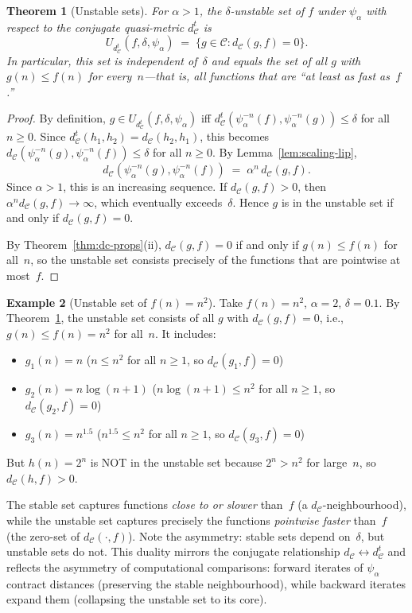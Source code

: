 \documentclass[11pt,a4paper]{article}
\theoremstyle{plain}
\newtheorem{theoreminner}{Theorem}[section]
\theoremstyle{definition}
\newtheorem{exampleinner}[theoreminner]{Example}
\newenvironment{theorem}[1][]{\begin{theoreminner}[#1]}{\end{theoreminner}}
\newenvironment{example}[1][]{\begin{exampleinner}[#1]}{\end{exampleinner}}
\newcommand{\C}{\mathcal{C}}
\begin{document}
\begin{theorem}[Unstable sets]\label{thm:unstable-sets}
For $\alpha>1$, the $\delta$-unstable set of $f$ under $\psi_\alpha$
with respect to the \emph{conjugate} quasi-metric $d_\C^t$ is
\[
  U_{d_\C^t}(f,\delta,\psi_\alpha)
  \;=\; \{g\in\C : d_\C(g,f)=0\}.
\]
In particular, this set is independent of~$\delta$ and equals the set
of all $g$ with $g(n)\le f(n)$ for every~$n$---that is,
all functions that are ``at least as fast as~$f$.''
\end{theorem}

\begin{proof}
By definition,
$g\in U_{d_\C^t}(f,\delta,\psi_\alpha)$ iff
$d_\C^t(\psi_\alpha^{-n}(f),\psi_\alpha^{-n}(g))\le\delta$
for all $n\ge 0$.  Since
$d_\C^t(h_1,h_2)=d_\C(h_2,h_1)$, this becomes
$d_\C(\psi_\alpha^{-n}(g),\psi_\alpha^{-n}(f))\le\delta$ for all
$n\ge 0$.  By Lemma~\ref{lem:scaling-lip},
\[
  d_\C(\psi_\alpha^{-n}(g),\psi_\alpha^{-n}(f))
  \;=\;\alpha^n\,d_\C(g,f).
\]
Since $\alpha>1$, this is an increasing sequence.  If
$d_\C(g,f)>0$, then $\alpha^n d_\C(g,f)\to\infty$, which
eventually exceeds~$\delta$.  Hence $g$ is in the unstable set if and
only if $d_\C(g,f)=0$.

By Theorem~\ref{thm:dc-props}(ii), $d_\C(g,f)=0$ if and only if
$g(n)\le f(n)$ for all~$n$, so the unstable set consists precisely
of the functions that are pointwise at most~$f$.
\end{proof}

\begin{example}[Unstable set of $f(n)=n^2$]\label{ex:unstable-quad}
Take $f(n)=n^2$, $\alpha=2$, $\delta=0.1$. By Theorem~\ref{thm:unstable-sets},
the unstable set consists of all $g$ with $d_\C(g,f)=0$, i.e., $g(n)\le f(n)=n^2$
for all~$n$.  It includes:
\begin{itemize}
\item $g_1(n)=n$ ($n\le n^2$ for all $n\ge 1$, so $d_\C(g_1,f)=0$)
\item $g_2(n)=n\log(n+1)$ ($n\log(n+1)\le n^2$ for all $n\ge 1$, so $d_\C(g_2,f)=0$)
\item $g_3(n)=n^{1.5}$ ($n^{1.5}\le n^2$ for all $n\ge 1$, so $d_\C(g_3,f)=0$)
\end{itemize}
But $h(n)=2^n$ is NOT in the unstable set because $2^n>n^2$ for
large~$n$, so $d_\C(h,f)>0$.
\end{example}

\begin{insightbox}
The stable set captures functions \emph{close to or slower} than~$f$
(a $d_\C$-neighbourhood), while the unstable set captures precisely
the functions \emph{pointwise faster} than~$f$ (the zero-set of
$d_\C(\cdot,f)$).  Note the asymmetry: stable sets depend on~$\delta$,
but unstable sets do not.  This duality mirrors the conjugate
relationship $d_\C\leftrightarrow d_\C^t$ and reflects the
asymmetry of computational comparisons: forward iterates of
$\psi_\alpha$ contract distances (preserving the stable
neighbourhood), while backward iterates expand them (collapsing the
unstable set to its core).
\end{insightbox}
\end{document}
